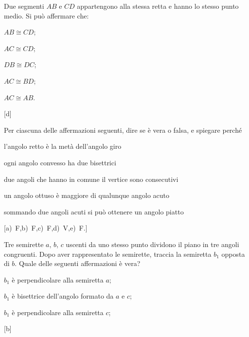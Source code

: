 \begin{esercizio}
\label{ese:1.72}
Due segmenti \(AB\) e \(CD\) appartengono alla stessa retta e hanno lo 
stesso punto medio. Si può affermare che:
\vspace{-.5em}
\begin{multicols}{5}
\begin{enumeratea}
\item \(AB\cong CD\);
\item \(AC\cong CD\);
\item \(DB\cong DC\);
\item \(AC\cong BD\);
\item \(AC\cong AB\).
\end{enumeratea}
\end{multicols}
\vspace{-18pt}
\hfill[d]
\end{esercizio}

\begin{esercizio}
\label{ese:1.73}
Per ciascuna delle affermazioni seguenti, dire se è vera o falsa, e 
spiegare perché
\begin{enumeratea}
\item l'angolo retto è la metà dell'angolo giro
\hfill \boxV\quad\boxF
\item ogni angolo convesso ha due bisettrici
\hfill \boxV\quad\boxF
\item due angoli che hanno in comune il vertice sono consecutivi
\hfill \boxV\quad\boxF
\item un angolo ottuso è maggiore di qualunque angolo acuto
\hfill \boxV\quad\boxF
\item sommando due angoli acuti si può ottenere un angolo piatto
\hfill \boxV\quad\boxF
\end{enumeratea}
\vspace{-.5em}
\hfill[a)~F,\quad b)~F,\quad c)~F,\quad d)~V,\quad e)~F.]
\end{esercizio}

\begin{esercizio}
\label{ese:1.74}
Tre semirette \(a\), \(b\), \(c\) uscenti da uno stesso punto dividono il 
piano in tre angoli congruenti. Dopo aver rappresentato le semirette, 
traccia la semiretta \(b_1\) opposta di \(b\). Quale delle seguenti 
affermazioni è vera?
\begin{enumeratea}
\item \(b_1\) è perpendicolare alla semiretta \(a\);
\item \(b_1\) è bisettrice dell'angolo formato da \(a\) e \(c\);
\item \(b_1\) è perpendicolare alla semiretta \(c\);
\end{enumeratea}
\vspace{-18pt}
\hfill[b]
\end{esercizio}

